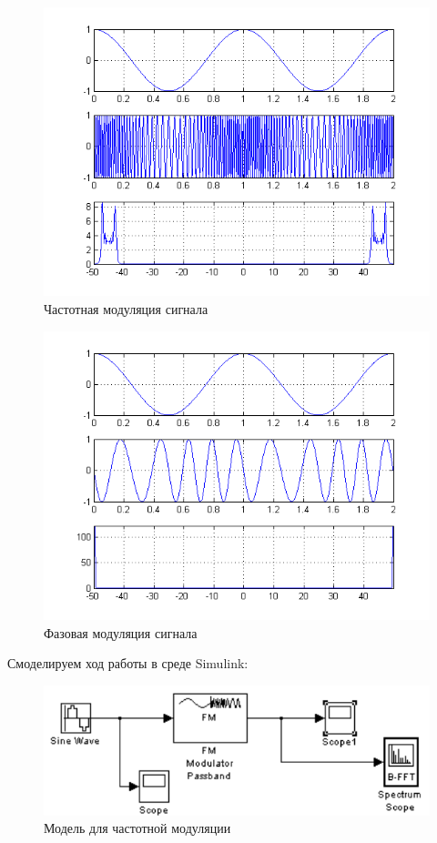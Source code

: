 \begin{figure}[H]

\includegraphics[width=150mm, scale = 0.9]{lab8/8_1}
   \caption{Частотная модуляция сигнала}

\end{figure}
\begin{figure}[H]

\includegraphics[width=150mm, scale = 0.9]{lab8/8_2}
   \caption{Фазовая модуляция сигнала}

\end{figure}
Смоделируем ход работы в среде Simulink:
\begin{figure}[H]

\includegraphics[width=150mm, scale = 0.9]{lab8/8_3}
   \caption{Модель для частотной модуляции}

\end{figure}
